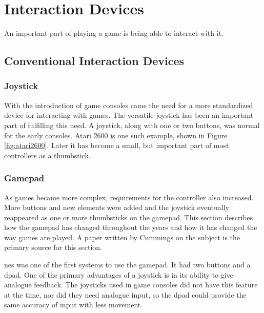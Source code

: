 \chapter{Interaction Devices}
\label{chap:interaction}
An important part of playing a game is being able to interact with it.



\section{Conventional Interaction Devices}
\subsection{Joystick}
With the introduction of game consoles came the need for a more standardized device for interacting with games.
The versatile joystick has been an important part of fulfilling this need.
A joystick, along with one or two buttons, was normal for the early consoles.
Atari 2600 is one such example, shown in Figure \ref{fig:atari2600}.
Later it has become a small, but important part of most controllers as a thumbstick.
\subsection{Gamepad}
As games became more complex, requirements for the controller also increased.
More buttons and new elements were added and the joystick eventually reappeared as one or more thumbsticks on the gamepad.
This section describes how the gamepad has changed throughout the years and how it has changed the way games are played.
A paper written by Cummings \cite{cummings2007evolution} on the subject is the primary source for this section.

\gls{nes} was one of the first systems to use the gamepad.
It had two buttons and a \gls{dpad}.
One of the primary advantages of a joystick is in its ability to give analogue feedback.
The joysticks used in game consoles did not have this feature at the time, nor did they need analogue input, so the \gls{dpad} could provide the same accuracy of input with less movement.


